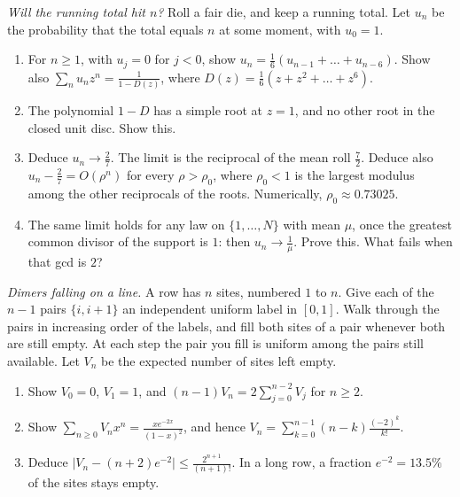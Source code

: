 \begin{exercise}[$\star\star$]\label{pb:diehit}
\emph{Will the running total hit $n$?} Roll a fair die, and keep a running total. Let $u_n$ be the probability that the total equals $n$ at some moment, with $u_0=1$.
\begin{enumerate}[label=(\alph*)]
\item For $n\ge1$, with $u_j=0$ for $j<0$, show $u_n=\frac16(u_{n-1}+\dots+u_{n-6})$. Show also $\sum_nu_nz^n=\frac1{1-D(z)}$, where $D(z)=\frac16(z+z^2+\dots+z^6)$.
\item The polynomial $1-D$ has a simple root at $z=1$, and no other root in the closed unit disc. Show this.
\item Deduce $u_n\to\frac27$. The limit is the reciprocal of the mean roll $\frac72$. Deduce also $u_n-\frac27=O(\rho^n)$ for every $\rho>\rho_0$, where $\rho_0<1$ is the largest modulus among the other reciprocals of the roots. Numerically, $\rho_0\approx0.73025$.
\item The same limit holds for any law on $\{1,\dots,N\}$ with mean $\mu$, once the greatest common divisor of the support is $1$: then $u_n\to\frac1\mu$. Prove this. What fails when that gcd is $2$?
\end{enumerate}
\end{exercise}

\begin{exercise}[$\star\star$]\label{pb:flory}
\emph{Dimers falling on a line.} A row has $n$ sites, numbered $1$ to $n$. Give each of the $n-1$ pairs $\{i,i+1\}$ an independent uniform label in $[0,1]$. Walk
through the pairs in increasing order of the labels, and fill both sites of a pair whenever both are still empty. At each step the pair you fill is
uniform among the pairs still available. Let $V_n$ be the expected number of sites left empty.
\begin{enumerate}[label=(\alph*)]
\item Show $V_0=0$, $V_1=1$, and $(n-1)V_n=2\sum_{j=0}^{n-2}V_j$ for $n\ge2$.
\item Show $\sum_{n\ge0}V_nx^n=\frac{xe^{-2x}}{(1-x)^2}$, and hence $V_n=\sum_{k=0}^{n-1}(n-k)\frac{(-2)^k}{k!}$.
\item Deduce $\bigl|V_n-(n+2)e^{-2}\bigr|\le\frac{2^{n+1}}{(n+1)!}$. In a long row, a fraction $e^{-2}=13.5\%$ of the sites stays empty.
\end{enumerate}
\end{exercise}

